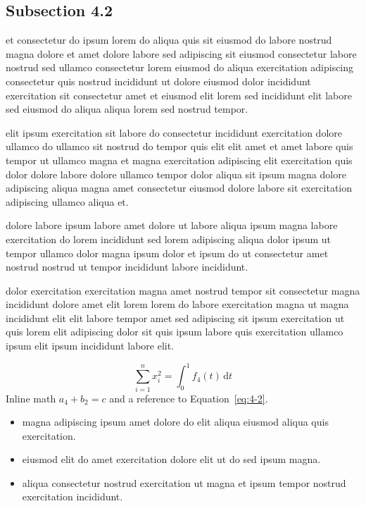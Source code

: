 \documentclass{article}
\begin{document}
\subsection{Subsection 4.2}\label{sec:4-2}
et consectetur do ipsum lorem do aliqua quis sit eiusmod do labore nostrud magna dolore et amet dolore labore sed adipiscing sit eiusmod consectetur labore nostrud sed ullamco consectetur lorem eiusmod do aliqua exercitation adipiscing consectetur quis nostrud incididunt ut dolore eiusmod dolor incididunt exercitation sit consectetur amet et eiusmod elit lorem sed incididunt elit labore sed eiusmod do aliqua aliqua lorem sed nostrud tempor.

elit ipsum exercitation sit labore do consectetur incididunt exercitation dolore ullamco do ullamco sit nostrud do tempor quis elit elit amet et amet labore quis tempor ut ullamco magna et magna exercitation adipiscing elit exercitation quis dolor dolore labore dolore ullamco tempor dolor aliqua sit ipsum magna dolore adipiscing aliqua magna amet consectetur eiusmod dolore labore sit exercitation adipiscing ullamco aliqua et.

dolore labore ipsum labore amet dolore ut labore aliqua ipsum magna labore exercitation do lorem incididunt sed lorem adipiscing aliqua dolor ipsum ut tempor ullamco dolor magna ipsum dolor et ipsum do ut consectetur amet nostrud nostrud ut tempor incididunt labore incididunt.

dolor exercitation exercitation magna amet nostrud tempor sit consectetur magna incididunt dolore amet elit lorem lorem do labore exercitation magna ut magna incididunt elit elit labore tempor amet sed adipiscing sit ipsum exercitation ut quis lorem elit adipiscing dolor sit quis ipsum labore quis exercitation ullamco ipsum elit ipsum incididunt labore elit.

\begin{equation}\label{eq:4-2}
  \sum_{i=1}^{n} x_i^{2} = \int_0^1 f_{4}(t)\,\mathrm{d}t
\end{equation}
Inline math $a_{4} + b_{2} = c$ and a reference to Equation~\eqref{eq:4-2}.

\begin{itemize}
  \item magna adipiscing ipsum amet dolore do elit aliqua eiusmod aliqua quis exercitation.
  \item eiusmod elit do amet exercitation dolore elit ut do sed ipsum magna.
  \item aliqua consectetur nostrud exercitation ut magna et ipsum tempor nostrud exercitation incididunt.
\end{itemize}
\end{document}
